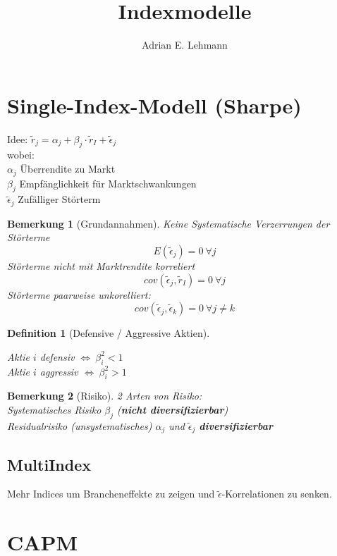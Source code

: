 \documentclass[a4paper]{article}
\title{Indexmodelle}
\author{Adrian E. Lehmann}
\theoremstyle{break}
\newtheorem{defi}{Definition}[section]
\newtheorem{ann}{Bemerkung}[section]
\begin{document}
        \maketitle
        \tableofcontents
        \newpage
        
\section{Single-Index-Modell (Sharpe)}
Idee: $\tilde{r}_j = \alpha_j + \beta_j \cdot \tilde{r}_I + \tilde{\epsilon}_j$\\
wobei:\\
$\alpha_j$ Überrendite zu Markt\\
$\beta_j$ Empfänglichkeit für Marktschwankungen\\
$\tilde{\epsilon}_j$ Zufälliger Störterm\\

\begin{ann}[Grundannahmen]
    Keine Systematische Verzerrungen der Störterme
        $$E(\tilde{\epsilon}_j) = 0 ~ \forall j$$
    Störterme nicht mit Marktrendite korreliert
        $$cov(\tilde{\epsilon}_j, \tilde{r}_I) = 0 ~ \forall j$$
    Störterme paarweise unkorelliert:
         $$cov(\tilde{\epsilon}_j, \tilde{\epsilon}_k) = 0 ~ \forall j \neq k$$
\end{ann}
\begin{defi}[Defensive / Aggressive Aktien]
    \begin{center}
        Aktie $i$ defensiv $\Longleftrightarrow ~ \beta^{2}_i < 1$\\
        Aktie $i$ aggressiv $\Longleftrightarrow ~ \beta^{2}_i > 1$
    \end{center}
\end{defi}
\begin{ann}[Risiko]
    2 Arten von Risiko:\\
    Systematisches Risiko $\beta_j$ (\textbf{nicht diversifizierbar})\\
    Residualrisiko (unsystematisches) $\alpha_j$ und $\tilde{\epsilon}_j$ \textbf{diversifizierbar} 
\end{ann}
\subsection{MultiIndex}
Mehr Indices um Brancheneffekte zu zeigen und $\tilde{\epsilon}$-Korrelationen zu senken.

\section{CAPM}
\end{document}
